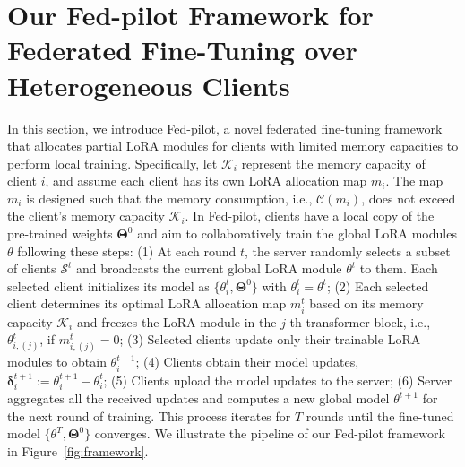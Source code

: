 \documentclass[sigconf]{acmart}
\begin{document}
\section{Our Fed-pilot Framework for Federated Fine-Tuning over Heterogeneous Clients}\label{framework}
In this section, we introduce Fed-pilot, a novel federated fine-tuning framework that allocates partial LoRA modules for clients with limited memory capacities to perform local training. Specifically, let $\mathcal{K}_i$ represent the memory capacity of client $i$, and assume each client has its own LoRA allocation map $m_i$. The map $m_i$ is designed such that the memory consumption, i.e., $\mathcal{C}(m_i)$, does not exceed the client's memory capacity $\mathcal{K}_i$. In Fed-pilot, clients have a local copy of the pre-trained weights $\boldsymbol{\Theta}^0$ and aim to collaboratively train the global LoRA modules $\boldsymbol{\mathcal{\theta}}$ following these steps: {(1) At each round $t$, the server randomly selects a subset of clients $\mathcal{S}^t$ and broadcasts the current global LoRA module $\boldsymbol{\mathcal{\theta}}^t$ to them.} %
Each selected client initializes its model as $\{\boldsymbol{\mathcal{\theta}}_i^t, \boldsymbol{\Theta}^0 \}$ with $\boldsymbol{\mathcal{\theta}}_i^t = \boldsymbol{\mathcal{\theta}}^t$; (2) Each selected client determines its optimal LoRA allocation map $m_i^t$ based on its memory capacity $\mathcal{K}_i$ and freezes the LoRA module in the $j$-th transformer block, i.e., $\boldsymbol{\mathcal{\theta}}_{i, (j)}^t$, if $m_{i, (j)}^t=0$; (3) Selected clients update only their trainable LoRA modules to obtain $\boldsymbol{\mathcal{\theta}}_i^{t+1}$; (4) Clients obtain their model updates, $ \boldsymbol{\delta}_i^{t+1} := \boldsymbol{\mathcal{\theta}}_i^{t+1} - \boldsymbol{\mathcal{\theta}}_i^t$; (5) Clients upload the model updates to the server; %
 (6) Server aggregates all the received updates and computes a new global model $\boldsymbol{\mathcal{\theta}}^{t+1}$ for the next round of training. This process iterates for $T$ rounds until the fine-tuned model $\{\boldsymbol{\mathcal{\theta}}^T, \boldsymbol{\Theta}^0\}$ converges. We illustrate the pipeline of our Fed-pilot framework in Figure~\ref{fig:framework}.
\end{document}
